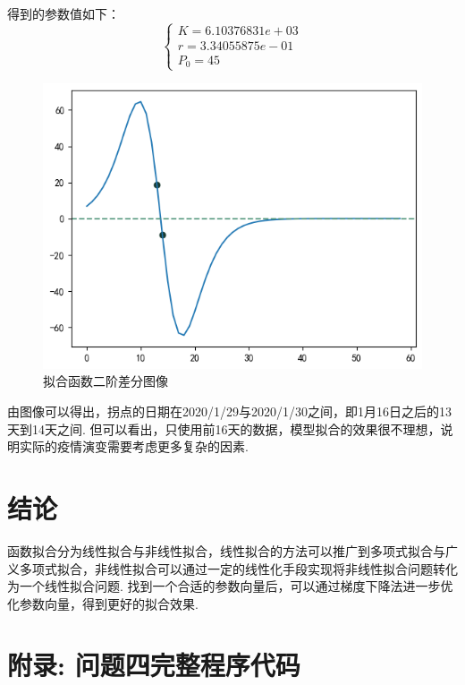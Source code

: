 \documentclass[UTF8,ctexart,a4paper,11pt,openany]{article}
\theoremstyle{definition}
\begin{document}
    得到的参数值如下：$$\left\{\begin{array}{l}
        K=6.10376831e+03 \\
        r=3.34055875e-01 \\
        P_0=45
        \end{array}\right.$$
    \begin{figure}[H]
        \centering
        \includegraphics[width=0.6\linewidth]{pics/P7.11.png}
        \caption{拟合函数二阶差分图像}
    \end{figure}
    由图像可以得出，拐点的日期在2020/1/29与2020/1/30之间，即1月16日之后的13天到14天之间. 但可以看出，只使用前16天的数据，模型拟合的效果很不理想，说明实际的疫情演变需要考虑更多复杂的因素.
\section{结论}
    函数拟合分为线性拟合与非线性拟合，线性拟合的方法可以推广到多项式拟合与广义多项式拟合，非线性拟合可以通过一定的线性化手段实现将非线性拟合问题转化为一个线性拟合问题. 找到一个合适的参数向量后，可以通过梯度下降法进一步优化参数向量，得到更好的拟合效果.
\clearpage

\section{附录: 问题四完整程序代码}
\end{document}
